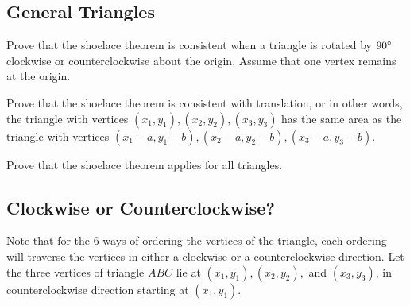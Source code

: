 \documentclass[11pt]{article}
\begin{document}
\subsection{General Triangles}

\begin{problem} \normalfont Prove that the shoelace theorem is consistent when a triangle is rotated by $90\degree$ clockwise or counterclockwise about the origin. Assume that one vertex remains at the origin. \end{problem}

\begin{solution}

\end{solution}

\begin{problem} \normalfont Prove that the shoelace theorem is consistent with translation, or in other words, the triangle with vertices $(x_1, y_1), (x_2, y_2), (x_3, y_3)$ has the same area as the triangle with vertices $(x_1 - a, y_1 - b), (x_2 - a, y_2 - b ), (x_3 - a, y_3 - b)$. \end{problem}

\begin{problem} \normalfont Prove that the shoelace theorem applies for all triangles. \end{problem}

\subsection{Clockwise or Counterclockwise?}
Note that for the 6 ways of ordering the vertices of the triangle, each ordering will traverse the vertices in either a clockwise or a counterclockwise direction. 
\newline \noindent Let the three vertices of triangle $ABC$ lie at $(x_1, y_1), (x_2, y_2),$  and $(x_3, y_3)$, in counterclockwise direction starting at $(x_1, y_1)$. 
\end{document}
